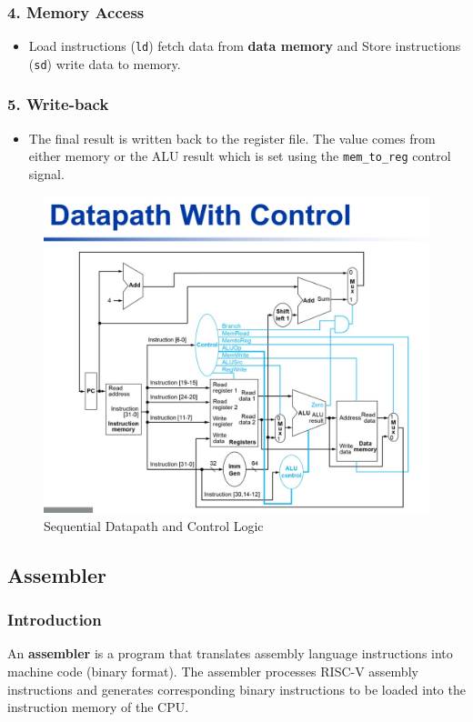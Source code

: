 \documentclass{article}
\numberwithin{figure}{section}
\numberwithin{table}{section}
\begin{document}
\subsubsection*{4. Memory Access}
\begin{itemize}
    \item Load instructions (\texttt{ld}) fetch data from \textbf{data memory} and Store instructions (\texttt{sd}) write data to memory.
\end{itemize}
\subsubsection*{5. Write-back}
\begin{itemize}
    \item The final result is written back to the register file. The value comes from either memory or the ALU result which is set using the \texttt{mem\_to\_reg} control signal.
\end{itemize}
\begin{figure}[H]
    \centering
    \includegraphics[width=1\linewidth]{Sequential_datapath_control.jpg}
    \caption{Sequential Datapath and Control Logic}
    \label{fig:sequential-datapath}
\end{figure}
\subsection{Assembler}
\subsubsection{Introduction}
An \textbf{assembler} is a program that translates assembly language instructions into machine code (binary format). The assembler processes RISC-V assembly instructions and generates corresponding binary instructions to be loaded into the instruction memory of the CPU.
\end{document}
